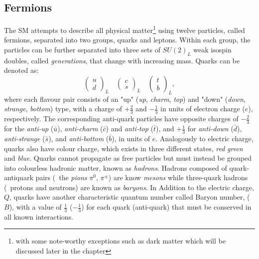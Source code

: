 	\subsection*{Fermions}
	The \ac{SM} attempts to describe all physical matter\footnote{with some note-worthy exceptions such as dark matter which will be discussed later in the chapter} using twelve particles, called fermions, separated into two groups, quarks and leptons. Within each group, the particles can be further separated into three sets of $SU(2)_L$ weak isospin doubles, called \textit{generations}, that change with increasing mass. 
	Quarks can be denoted as:
		\begin{equation}
			\begin{pmatrix} u \\ d \end{pmatrix}_L\quad 
			\begin{pmatrix} c \\ s \end{pmatrix}_L\quad 
			\begin{pmatrix} t \\ b \end{pmatrix}_L, 
			\label{eq:quarks}
		\end{equation}
	where each flavour pair consists of an "up" (\textit{up}, \textit{charm}, \textit{top}) and "down" (\textit{down}, \textit{strange}, \textit{bottom}) type, with a charge of $+\frac{2}{3}$ and $-\frac{1}{3}$ in units of electron charge ($e$), respectively. 
	The corresponding anti-quark particles have opposite charges of $-\frac{2}{3}$ for the \textit{anti-up} ($\bar{u}$), \textit{anti-charm} ($\bar{c}$) and \textit{anti-top} ($\bar{t}$), and $+\frac{1}{3}$ for \textit{anti-down} ($\bar{d}$), \textit{anti-strange} ($\bar{s}$), and \textit{anti-bottom} ($\bar{b}$), in units of $e$.
	Analogously to electric charge, quarks also have colour charge, which exists in three different states, \textit{red} \textit{green} and \textit{blue}. Quarks cannot propagate as free particles but must instead be grouped into colourless hadronic matter, known as \textit{hadrons}. Hadrons composed of quark-antiquark pairs (\eg\  the \textit{pions} $\pi^0$, $\pi^{\pm}$) are know \textit{mesons} while three-quark hadrons (\eg\ protons and neutrons) are known as \textit{baryons}. In Addition to the electric charge, $Q$, quarks have another characteristic quantum number called Baryon number, ($B$), with a value of $\frac{1}{3}$ ($-\frac{1}{3}$) for each quark (anti-quark) that must be conserved in all known interactions.
		 
